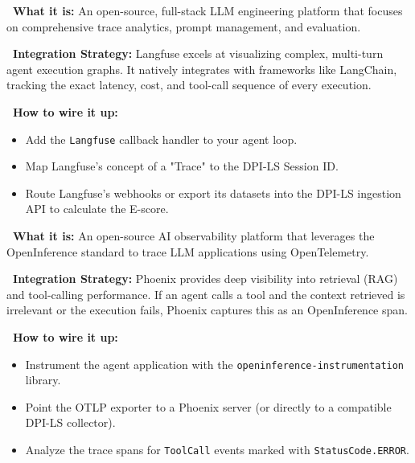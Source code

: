 \documentclass[11pt,a4paper]{article}
\begin{document}
\vspace{0.3cm}

\begin{tcolorbox}[enhanced, colback=gray!5!white, colframe=gray, title={\textbf{\faProjectDiagram\ Langfuse}}, fonttitle=\bfseries, boxrule=1pt, arc=2mm]
\textbf{\color{dpiblue}\faQuestionCircle\ What it is:} An open-source, full-stack LLM engineering platform that focuses on comprehensive trace analytics, prompt management, and evaluation.

\vspace{0.2cm}
\textbf{\color{dpigreen}\faCogs\ Integration Strategy:} Langfuse excels at visualizing complex, multi-turn agent execution graphs. It natively integrates with frameworks like LangChain, tracking the exact latency, cost, and tool-call sequence of every execution.

\vspace{0.2cm}
\textbf{\color{dpicloud}\faPlug\ How to wire it up:}
\begin{itemize}
    \item \textbf{\color{gray}\faLink} Add the \texttt{Langfuse} callback handler to your agent loop.
    \item \textbf{\color{gray}\faMapPin} Map Langfuse's concept of a "Trace" to the DPI-LS Session ID.
    \item \textbf{\color{gray}\faShareSquare} Route Langfuse's webhooks or export its datasets into the DPI-LS ingestion API to calculate the E-score.
\end{itemize}
\end{tcolorbox}

\vspace{0.3cm}

\begin{tcolorbox}[enhanced, colback=gray!5!white, colframe=gray, title={\textbf{\faFire\ Arize Phoenix}}, fonttitle=\bfseries, boxrule=1pt, arc=2mm]
\textbf{\color{dpiblue}\faQuestionCircle\ What it is:} An open-source AI observability platform that leverages the OpenInference standard to trace LLM applications using OpenTelemetry.

\vspace{0.2cm}
\textbf{\color{dpigreen}\faCogs\ Integration Strategy:} Phoenix provides deep visibility into retrieval (RAG) and tool-calling performance. If an agent calls a tool and the context retrieved is irrelevant or the execution fails, Phoenix captures this as an OpenInference span.

\vspace{0.2cm}
\textbf{\color{dpicloud}\faPlug\ How to wire it up:}
\begin{itemize}
    \item \textbf{\color{gray}\faTerminal} Instrument the agent application with the \texttt{openinference-instrumentation} library.
    \item \textbf{\color{gray}\faNetworkWired} Point the OTLP exporter to a Phoenix server (or directly to a compatible DPI-LS collector).
    \item \textbf{\color{gray}\faSearch} Analyze the trace spans for \texttt{ToolCall} events marked with \texttt{StatusCode.ERROR}.
\end{itemize}
\end{tcolorbox}
\end{document}
